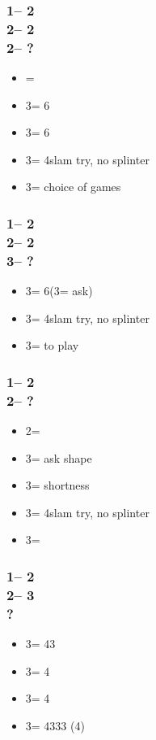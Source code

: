 \documentclass[12pt, a4paper]{report}
\begin{document}
{    \subsubsection*{1\nt -- 2\clubs\\
                    2\hearts -- 2\spades\\
                    2\nt -- ?}
    \begin{itemize}
        \item \pass = \inv\ \bal
        \item 3\clubs = 6\spades\ \inv
        \item 3\diams = 6\spades\ \inv
        \item 3\hearts = 4\hearts slam try, no splinter
        \item 3\nt = choice of games
    \end{itemize}

    \subsubsection*{1\nt -- 2\clubs\\
                    2\hearts -- 2\spades\\
                    3\clubs -- ?}
    \begin{itemize}
        \item 3\diams = 6\spades (3\hearts = ask)
        \item 3\hearts = 4\hearts slam try, no splinter
        \item 3\nt = to play
    \end{itemize}

    \subsubsection*{1\nt -- 2\clubs\\
                    2\spades -- ?}
    \begin{itemize}
        \item 2\nt = \inv
        \item 3\clubs = ask shape
        \item 3\diams = \minor shortness
        \item 3\hearts = 4\spades slam try, no splinter
        \item 3\spades = \inv
    \end{itemize}

    \subsubsection*{1\nt -- 2\clubs\\
                    2\major -- 3\clubs\\
                    ?}
    \begin{itemize}
        \item 3\diams = 43\minor
        \item 3\hearts = 4\clubs
        \item 3\spades = 4\diams
        \item 3\nt = 4333 (4\major)
    \end{itemize}

}
\end{document}
